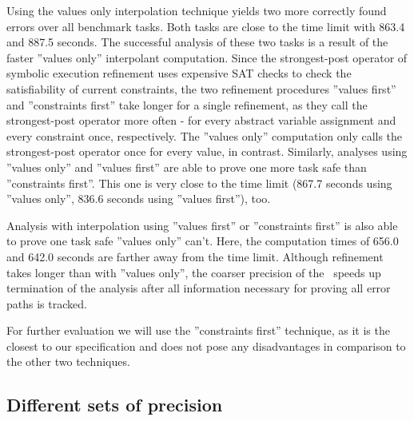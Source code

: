 Using the values only interpolation technique yields two more correctly found errors over all benchmark tasks.
Both tasks are close to the time limit with 863.4 and 887.5 seconds.
The successful analysis of these two tasks is a result of the faster ''values only'' interpolant computation.
Since the strongest-post operator of symbolic execution refinement uses expensive SAT checks to check the satisfiability of current constraints, the two refinement procedures
''values first'' and ''constraints first'' take longer for a single refinement, as they call the strongest-post operator more often - for every abstract variable assignment and every constraint once, respectively.
The ''values only'' computation only calls the strongest-post operator once for every value, in contrast.
Similarly, analyses using ''values only'' and ''values first'' are able to prove one more task safe than ''constraints first''.
This one is very close to the time limit (867.7 seconds using ''values only'', 836.6 seconds using ''values first''), too.

Analysis with interpolation using ''values first'' or ''constraints first'' is also able to prove one task safe ''values only'' can't.
Here, the computation times of 656.0 and 642.0 seconds are farther away from the time limit.
Although refinement takes longer than with ''values only'', the coarser precision of the \constraintsCPA\ speeds up termination of the analysis after all information necessary for proving all error paths is tracked.

For further evaluation we will use the ''constraints first'' technique, as it is the closest to our specification and does not pose any disadvantages in comparison to the other two techniques.

\subsection{Different sets of precision}

